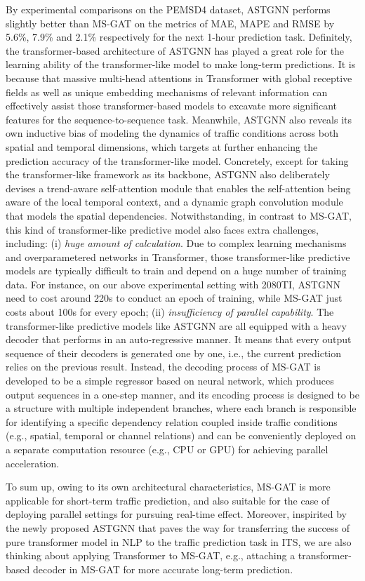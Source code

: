 By experimental comparisons on the PEMSD4 dataset, ASTGNN performs slightly better than MS-GAT on the metrics of MAE, MAPE and RMSE by 5.6\%, 7.9\% and 2.1\% respectively for the next 1-hour prediction task. Definitely, the transformer-based architecture of ASTGNN has played a great role for the learning ability of the transformer-like model to make long-term predictions. It is because that massive multi-head attentions in Transformer with global receptive fields as well as unique embedding mechanisms of relevant information can effectively assist those transformer-based models to excavate more significant features for the sequence-to-sequence task. Meanwhile, ASTGNN also reveals its own inductive bias of modeling the dynamics of traffic conditions across both spatial and temporal dimensions, which targets at further enhancing the prediction accuracy of the transformer-like model. Concretely, except for taking the transformer-like framework as its backbone, ASTGNN also deliberately devises a trend-aware self-attention module that enables the self-attention being aware of the local temporal context, and a dynamic graph convolution module that models the spatial dependencies. Notwithstanding, in contrast to MS-GAT, this kind of transformer-like predictive model also faces extra challenges, including: (i) \textit{huge amount of calculation}. Due to complex learning mechanisms and overparametered networks in Transformer, those transformer-like predictive models are typically difficult to train and depend on a huge number of training data. For instance, on our above experimental setting with 2080TI, ASTGNN need to cost around 220s to conduct an epoch of training, while MS-GAT just costs about 100s for every epoch; (ii) \textit{insufficiency of parallel capability}. The transformer-like predictive models like ASTGNN are all equipped with a heavy decoder that performs in an auto-regressive manner. It means that every output sequence of their decoders is generated one by one, i.e., the current prediction relies on the previous result. Instead, the decoding process of MS-GAT is developed to be a simple regressor based on neural network, which produces output sequences in a one-step manner, and its encoding process is designed to be a structure with multiple independent branches, where each branch is responsible for identifying a specific dependency relation coupled inside traffic conditions (e.g., spatial, temporal or channel relations) and can be conveniently deployed on a separate computation resource (e.g., CPU or GPU) for achieving parallel acceleration. 

To sum up, owing to its own architectural characteristics, MS-GAT is more applicable for short-term traffic prediction, and also suitable for the case of deploying parallel settings for pursuing real-time effect. Moreover, inspirited by the newly proposed ASTGNN that paves the way for transferring the success of pure transformer model in NLP to the traffic prediction task in ITS, we are also thinking about applying Transformer to MS-GAT, e.g., attaching a transformer-based decoder in MS-GAT for more accurate long-term prediction. 
